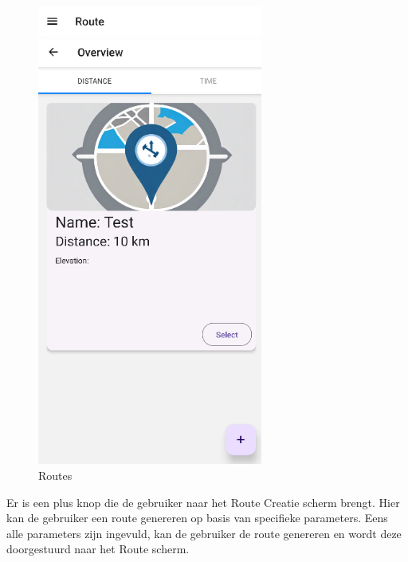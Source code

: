     \begin{figure}[htbp]
        \includegraphics[width=20em]{./graphics/routes.png}
        \centering
        \caption{Routes}
        \label{fig:routes}
    \end{figure}

    Er is een plus knop die de gebruiker naar het Route Creatie scherm brengt. Hier kan de gebruiker een route genereren op basis van specifieke parameters. Eens alle parameters zijn ingevuld, kan de gebruiker de route genereren en wordt deze doorgestuurd naar het Route scherm.

